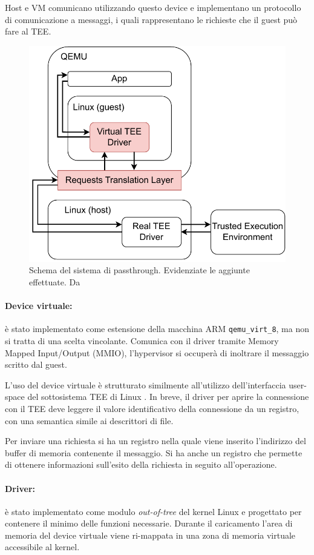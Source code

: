 \documentclass[12pt,italian]{report}
\begin{document}
	Host e VM comunicano utilizzando questo device e implementano un protocollo di comunicazione a messaggi, i quali rappresentano le richieste che il guest può fare al TEE.
	
	\begin{figure}[h]
		\centering
		\includegraphics[width=0.7\linewidth]{immagini/tee-passthrough-schema}
		\caption{
			Schema del sistema di passthrough. Evidenziate le aggiunte effettuate. Da \cite{tesi_cutecchia}
		}
		\label{fig:passthrough-schema}
	\end{figure}
	
	\paragraph{Device virtuale:} è stato implementato come estensione della macchina ARM \texttt{qemu\_virt\_8}, ma non si tratta di una scelta vincolante. Comunica con il driver tramite Memory Mapped Input/Output (MMIO), l'hypervisor si occuperà di inoltrare il messaggio scritto dal guest.
	
	L'uso del device virtuale è strutturato similmente all'utilizzo dell'interfaccia user-space del sottosistema TEE di Linux \cite{linux_tee_subsystem}. In breve, il driver per aprire la connessione con il TEE deve leggere il valore identificativo della connessione da un registro, con una semantica simile ai descrittori di file. 
	
	Per inviare una richiesta si ha un registro nella quale viene inserito l'indirizzo del buffer di memoria contenente il messaggio. Si ha anche un registro che permette di ottenere informazioni sull'esito della richiesta in seguito all'operazione.
	
	\paragraph{Driver:} è stato implementato come modulo \textit{out-of-tree} del kernel Linux e progettato per contenere il minimo delle funzioni necessarie. Durante il caricamento l'area di memoria del device virtuale viene ri-mappata in una zona di memoria virtuale accessibile al kernel.
	
\end{document}
